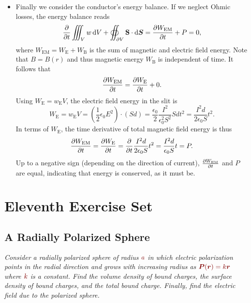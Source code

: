 \documentclass[11pt, a4paper]{article}
\newcommand{\diff}{\mathop{}\!\mathrm{d}} %
\newcommand{\dmath}[1]{\textcolor{Maroon}{#1}}  %
\renewcommand{\vec}[1]{\bm{#1}} %
\renewcommand{\r}{\vec{r}}
\renewcommand{\S}{\mathbf{S}}  %
\newcommand{\ee}{\epsilon_{0}}  %
\renewcommand{\P}{\vec{P}}  %
\begin{document}
\begin{itemize}
	\item  Finally we consider the conductor's energy balance. If we neglect Ohmic losses, the energy balance reads
	\begin{equation*}
		\pdv{t}\iiint_{V}w \diff V + \oiint_{\partial V} \S \cdot \diff \vec{S} = \pdv{W_{\text{EM}}}{t} + P = 0,
	\end{equation*}
	where $ W_{\text{EM}} = W_{\text{E}} + W_{\text{B}} $ is the sum of magnetic and electric field energy. Note that $ B = B(r)$  and thus magnetic energy $ W_{\text{B}} $ is independent of time. It follows that
	\begin{equation*}
		\pdv{W_{\text{EM}}}{t} = \pdv{W_{\text{E}}}{t} + 0.
	\end{equation*}
	Using $ W_{\text{E}} = w_{\text{E}}V $, the electric field energy in the slit is
	\begin{equation*}
		W_{\text{E}} = w_{\text{E}}V = \left(\frac{1}{2} \ee E^{2}\right) \cdot \left(Sd\right) = \frac{\ee}{2}\frac{I^{2}}{\ee^{2}S^{2}}Sdt^{2} = \frac{I^{2}d}{2\ee S}t^{2}.
	\end{equation*}
	In terms of $ W_{\text{E}} $, the time derivative of total magnetic field energy is thus
	\begin{equation*}
		\pdv{W_{\text{EM}}}{t} = \pdv{W_{\text{E}}}{t} = \pdv{t}\frac{I^{2}d}{2\ee S}t^{2} = \frac{I^{2}d}{\ee S} t = P.
	\end{equation*}
	Up to a negative sign (depending on the direction of current), $ \pdv{W_{\text{EM}}}{t} $ and $ P $ are equal, indicating that energy is conserved, as it must be.
\end{itemize}

\newpage
\section{Eleventh Exercise Set}

\subsection{A Radially Polarized Sphere}
\textit{Consider a radially polarized sphere of radius $ \dmath{a} $ in which electric polarization points in the radial direction and grows with increasing radius as $ \dmath{\P(\r) = k \r} $ where $ \dmath{k} $ is a constant. Find the volume density of bound charges, the surface density of bound charges, and the total bound charge. Finally, find the electric field due to the polarized sphere.}
\end{document}
